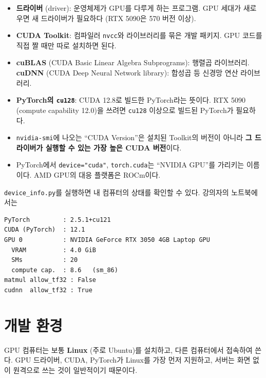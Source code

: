 \documentclass[11pt,a4paper]{article}
\begin{document}
\begin{itemize}[leftmargin=1.5em]
\item \textbf{드라이버} (driver): 운영체제가 GPU를 다루게 하는 프로그램. GPU 세대가 새로우면 새 드라이버가 필요하다 (RTX 5090은 570 버전 이상).
\item \textbf{CUDA Toolkit}: 컴파일러 \texttt{nvcc}와 라이브러리를 묶은 개발 패키지. GPU 코드를 직접 짤 때만 따로 설치하면 된다.
\item \textbf{cuBLAS} (CUDA Basic Linear Algebra Subprograms): 행렬곱 라이브러리. \textbf{cuDNN} (CUDA Deep Neural Network library): 합성곱 등 신경망 연산 라이브러리.
\item \textbf{PyTorch의 \texttt{cu128}}: CUDA 12.8로 빌드한 PyTorch라는 뜻이다. RTX 5090 (compute capability 12.0)을 쓰려면 \texttt{cu128} 이상으로 빌드된 PyTorch가 필요하다.
\item \texttt{nvidia-smi}에 나오는 ``CUDA Version''은 설치된 Toolkit의 버전이 아니라 \textbf{그 드라이버가 실행할 수 있는 가장 높은 CUDA 버전}이다.
\item PyTorch에서 \texttt{device="cuda"}, \texttt{torch.cuda}는 ``NVIDIA GPU''를 가리키는 이름이다. AMD GPU의 대응 플랫폼은 ROCm이다.
\end{itemize}

\texttt{device\_info.py}를 실행하면 내 컴퓨터의 상태를 확인할 수 있다. 강의자의 노트북에서는

\begin{lstlisting}[numbers=none,language={}]
PyTorch         : 2.5.1+cu121
CUDA (PyTorch)  : 12.1
GPU 0           : NVIDIA GeForce RTX 3050 4GB Laptop GPU
  VRAM          : 4.0 GiB
  SMs           : 20
  compute cap.  : 8.6   (sm_86)
matmul allow_tf32 : False
cudnn  allow_tf32 : True
\end{lstlisting}

\section{개발 환경}\label{sec:devenv}

GPU 컴퓨터는 보통 \textbf{Linux} (주로 Ubuntu)를 설치하고, 다른 컴퓨터에서 접속하여 쓴다.
GPU 드라이버, CUDA, PyTorch가 Linux를 가장 먼저 지원하고, 서버는 화면 없이 원격으로 쓰는 것이 일반적이기 때문이다.
\end{document}
